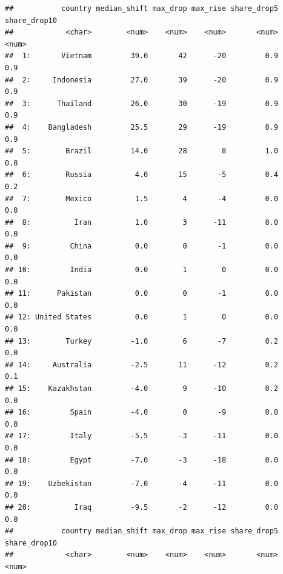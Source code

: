 \documentclass[
  11pt,
]{article}
\begin{document}
\begin{verbatim}
##           country median_shift max_drop max_rise share_drop5 share_drop10
##            <char>        <num>    <num>    <num>       <num>        <num>
##  1:       Vietnam         39.0       42      -20         0.9          0.9
##  2:     Indonesia         27.0       39      -20         0.9          0.9
##  3:      Thailand         26.0       30      -19         0.9          0.9
##  4:    Bangladesh         25.5       29      -19         0.9          0.9
##  5:        Brazil         14.0       28        8         1.0          0.8
##  6:        Russia          4.0       15       -5         0.4          0.2
##  7:        Mexico          1.5        4       -4         0.0          0.0
##  8:          Iran          1.0        3      -11         0.0          0.0
##  9:         China          0.0        0       -1         0.0          0.0
## 10:         India          0.0        1        0         0.0          0.0
## 11:      Pakistan          0.0        0       -1         0.0          0.0
## 12: United States          0.0        1        0         0.0          0.0
## 13:        Turkey         -1.0        6       -7         0.2          0.0
## 14:     Australia         -2.5       11      -12         0.2          0.1
## 15:    Kazakhstan         -4.0        9      -10         0.2          0.0
## 16:         Spain         -4.0        0       -9         0.0          0.0
## 17:         Italy         -5.5       -3      -11         0.0          0.0
## 18:         Egypt         -7.0       -3      -18         0.0          0.0
## 19:    Uzbekistan         -7.0       -4      -11         0.0          0.0
## 20:          Iraq         -9.5       -2      -12         0.0          0.0
##           country median_shift max_drop max_rise share_drop5 share_drop10
##            <char>        <num>    <num>    <num>       <num>        <num>
\end{verbatim}
\end{document}
